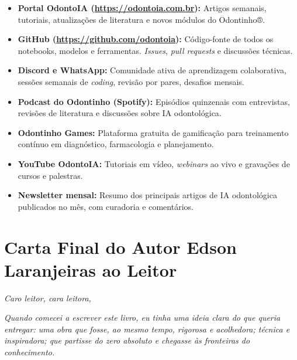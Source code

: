 \begin{itemize}
  \item \textbf{Portal OdontoIA (\url{https://odontoia.com.br}):} Artigos
    semanais, tutoriais, atualizações de literatura e novos módulos do
    Odontinho®.

  \item \textbf{GitHub (\url{https://github.com/odontoia}):} Código-fonte de
    todos os notebooks, modelos e ferramentas. \textit{Issues}, \textit{pull
    requests} e discussões técnicas.

  \item \textbf{Discord e WhatsApp:} Comunidade ativa de aprendizagem
    colaborativa, sessões semanais de \textit{coding}, revisão por pares,
    desafios mensais.

  \item \textbf{Podcast do Odontinho (Spotify):} Episódios quinzenais com
    entrevistas, revisões de literatura e discussões sobre IA odontológica.

  \item \textbf{Odontinho Games:} Plataforma gratuita de gamificação para
    treinamento contínuo em diagnóstico, farmacologia e planejamento.

  \item \textbf{YouTube OdontoIA:} Tutoriais em vídeo, \textit{webinars} ao
    vivo e gravações de cursos e palestras.

  \item \textbf{Newsletter mensal:} Resumo dos principais artigos de IA
    odontológica publicados no mês, com curadoria e comentários.
\end{itemize}


\section{Carta Final do Autor Edson Laranjeiras ao Leitor}
\label{sec:carta-autor}

\nivelzero

\textit{Caro leitor, cara leitora,}

\textit{Quando comecei a escrever este livro, eu tinha uma ideia clara do que
queria entregar: uma obra que fosse, ao mesmo tempo, rigorosa e acolhedora;
técnica e inspiradora; que partisse do zero absoluto e chegasse às fronteiras
do conhecimento.}


